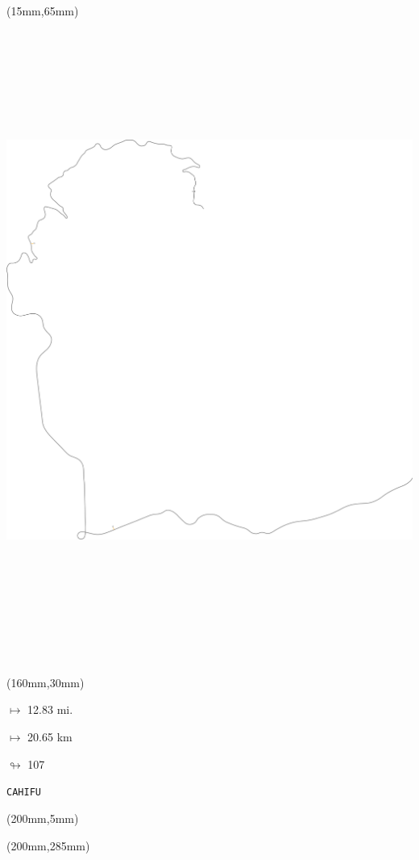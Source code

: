 \begin{textblock*}{185mm}(15mm,65mm)%
\centering
\mbox{\includegraphics[width=185mm,height=210mm,keepaspectratio]{PT/CAHIFU.pdf}}
\end{textblock*}
\begin{textblock*}{40mm}(160mm,30mm)%
\Large
\par$\mapsto$ 12.83 mi.
\par$\mapsto$ 20.65 km
\par$\looparrowright$ 107
\par\hfill\tiny\tt CAHIFU\\
\end{textblock*}
\begin{textblock*}{20mm}(200mm,5mm)%
\fbox{\thepage}
\label{CAHIFU}
\end{textblock*}
\begin{textblock*}{20mm}(200mm,285mm)%
\fbox{\thepage}
\end{textblock*}

